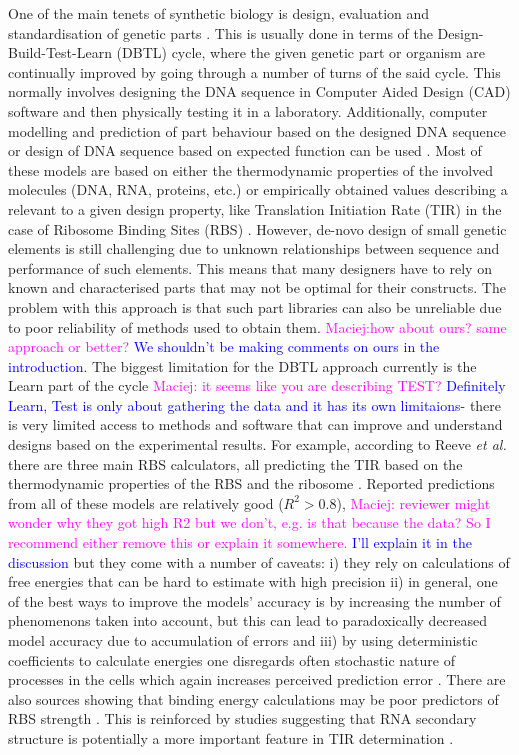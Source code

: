 \documentclass{article}
\newcommand{\mengyan}[1]{\textcolor{magenta}{#1}}
\newcommand{\maciej}[1]{\textcolor{blue}{#1}}
\begin{document}
One of the main tenets of synthetic biology is design, evaluation and standardisation of genetic parts \cite{Brophy2014,Canton2008,Stanton2014}.
This is usually done in terms of the Design-Build-Test-Learn (DBTL) cycle, where the given genetic part or organism are continually improved by going through a number of turns of the said cycle.
This normally involves designing the DNA sequence in Computer Aided Design (CAD) software and then physically testing it in a laboratory. 
Additionally, computer modelling and prediction of part behaviour based on the designed DNA sequence or design of DNA sequence based on expected function can be used \cite{Yeoh2019,Nielsen2016}.
Most of these models are based on either the thermodynamic properties of the involved molecules (DNA, RNA, proteins, etc.) or empirically obtained values describing a relevant to a given design property, like Translation Initiation Rate (TIR) in the case of Ribosome Binding Sites (RBS) \cite{Xia1998,Chen2013,Reeve2014}.
However, de-novo design of small genetic elements is still challenging due to unknown relationships between sequence and performance of such elements. 
This means that many designers have to rely on known and characterised parts that may not be optimal for their constructs.
The problem with this approach is that such part libraries can also be unreliable due to poor reliability of methods used to obtain them.
\mengyan{Maciej:how about ours? same approach or better?}
\maciej{We shouldn't be making comments on ours in the introduction.}
The biggest limitation for the DBTL approach currently is the Learn part of the cycle \mengyan{Maciej: it seems like you are describing TEST?} \maciej{Definitely Learn, Test is only about gathering the data and it has its own limitaions}- there is very limited access to methods and software that can improve and understand designs based on the experimental results.
For example, according to Reeve \emph{et al.} \textcite{Reeve2014}there are three main RBS calculators, all predicting the TIR based on the thermodynamic properties of the RBS and the ribosome \cite{Seo2013,Na2010,Salis2009}. 
Reported predictions from all of these models are relatively good ($R^2 >0.8$), \mengyan{Maciej: reviewer might wonder why they got high R2 but we don't, e.g. is that because the data? So I recommend either remove this or explain it somewhere.} \maciej{I'll explain it in the discussion}
but they come with a number of caveats: i) they rely on calculations of free energies that can be hard to estimate with high precision ii) in general, one of the best ways to improve the models' accuracy is by increasing the number of phenomenons taken into account, but this can lead to paradoxically decreased model accuracy due to accumulation of errors \cite{EspahBorujeni2016} and iii) by using deterministic coefficients to calculate energies one disregards often stochastic nature of processes in the cells which again increases perceived prediction error \cite{Goss1998}. 
There are also sources showing that binding energy calculations may be poor predictors of RBS strength \cite{Saito2020,Sherer1980} . This is reinforced by studies suggesting that RNA secondary structure is potentially a more important feature in TIR determination \cite{DESMIT1994,EspahBorujeni2016} .
\end{document}
